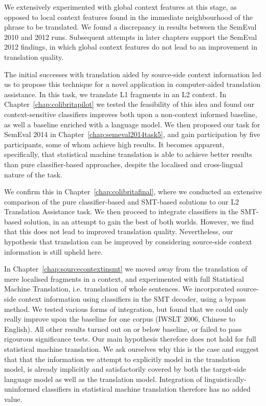 We extensively experimented with global context features at this stage, as
opposed to local context features found in the immediate neighbourhood of the
phrase to be translated. We found a discrepancy in results between the SemEval
2010 and 2012 runs. Subsequent attempts in later chapters support the SemEval
2012 findings, in which global context features do not lead to an improvement
in translation quality.

The initial successes with translation aided by source-side context information
led us to propose this technique for a novel application in computer-aided translation
assistance. In this task, we translate L1 fragments in an L2 context.
In Chapter~\ref{chap:colibritapilot} we tested the feasibility of this idea and
found our context-sensitive classifiers improves both upon a non-context informed
baseline, as well a baseline enriched with a language model. We then
proposed our task for SemEval 2014 in Chapter~\ref{chap:semeval2014task5}, and gain
participation by five participants, some of whom achieve high results. It
becomes apparent, specifically, that statistical machine translation is able to
achieve better results than pure classifier-based approaches, despite the
localised and cross-lingual nature of the task.

We confirm this in Chapter~\ref{chap:colibritafinal}, where we conducted an
extensive comparison of the pure classifier-based and SMT-based solutions to
our L2 Translation Assistance task. We then proceed to integrate classifiers in
the SMT-based solution, in an attempt to gain the best of both worlds. However,
we find that this does not lead to improved translation quality. Nevertheless,
our hypothesis that translation can be improved by considering source-side
context information is still upheld here. 

In Chapter~\ref{chap:sourcecontextinsmt} we moved away from the translation of
mere localised fragments in a context, and experimented with full Statistical
Machine Translation, i.e. translation of whole sentences. We incorporated
source-side context information using classifiers in the SMT decoder, using a
bypass method. We tested various forms of integration, but found that we could
only really improve upon the baseline for one corpus (IWSLT 2006, Chinese to
English). All other results turned out on or below baseline, or failed to pass
rigourous significance tests. Our main hypothesis therefore does not hold for
full statistical machine translation. We ask ourselves why this is the case and
suggest that that the information we attempt to explicitly model in the
translation model, is already implicitly and satisfactorily covered by both the
target-side language model as well as the translation model. Integration of
linguistically-uninformed classifiers in statistical machine translation
therefore has no added value.

